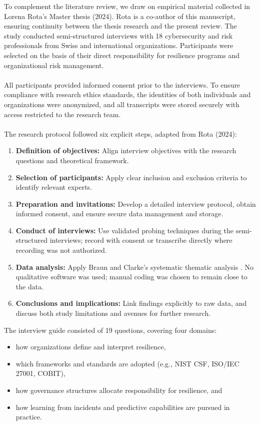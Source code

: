 To complement the literature review, we draw on empirical material collected in Lorena Rota’s Master thesis (2024). Rota is a co-author of this manuscript, ensuring continuity between the thesis research and the present review. The study conducted semi-structured interviews with 18 cybersecurity and risk professionals from Swiss and international organizations. Participants were selected on the basis of their direct responsibility for resilience programs and organizational risk management.\\
\\
All participants provided informed consent prior to the interviews. To ensure compliance with research ethics standards, the identities of both individuals and organizations were anonymized, and all transcripts were stored securely with access restricted to the research team.\\
\\
The research protocol followed six explicit steps, adapted from Rota (2024):
\begin{enumerate}
    \item \textbf{Definition of objectives:} Align interview objectives with the research questions and theoretical framework.
    \item \textbf{Selection of participants:} Apply clear inclusion and exclusion criteria to identify relevant experts.
    \item \textbf{Preparation and invitations:} Develop a detailed interview protocol, obtain informed consent, and ensure secure data management and storage.
    \item \textbf{Conduct of interviews:} Use validated probing techniques during the semi-structured interviews;
    record with consent or transcribe directly where recording was not authorized.  
    \item \textbf{Data analysis:} Apply Braun and Clarke’s systematic thematic analysis \autocite{braun2019thematic}.
    No qualitative software was used; manual coding was chosen to remain close to the data.  
    \item \textbf{Conclusions and implications:} Link findings explicitly to raw data, and discuss both study limitations and avenues for further research.\\
\end{enumerate}

The interview guide consisted of 19 questions, covering four domains:

\begin{itemize}
    \item[(a)] how organizations define and interpret resilience,
    \item[(b)] which frameworks and standards are adopted (e.g., NIST CSF, ISO/IEC 27001, COBIT),
    \item[(c)] how governance structures allocate responsibility for resilience, and
    \item[(d)] how learning from incidents and predictive capabilities are pursued in practice.\\
\end{itemize}

